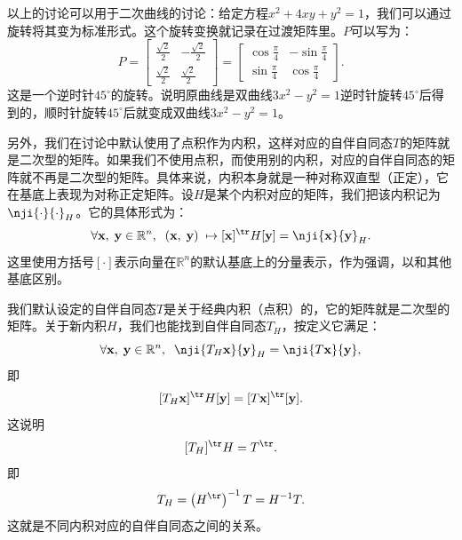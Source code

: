 \documentclass[12pt,UTF8,fontset=none]{ctexbook}
\begin{document}
以上的讨论可以用于二次曲线的讨论：给定方程$x^2 + 4xy + y^2 = 1$，我们可以通过旋转将其变为标准形式。这个旋转变换就记录在过渡矩阵里。$P$可以写为：
$$
P = 
\begin{bmatrix}
    \displaystyle\frac{\sqrt{2}}{2} & \displaystyle -\frac{\sqrt{2}}{2} \\\displaystyle \frac{\sqrt{2}}{2} & \displaystyle\frac{\sqrt{2}}{2}
\end{bmatrix} = \begin{bmatrix}
    \displaystyle\cos{\frac{\pi}{4}} & \displaystyle -\sin{\frac{\pi}{4}} \\ \displaystyle\sin{\frac{\pi}{4}} & \displaystyle\cos{\frac{\pi}{4}}
\end{bmatrix}.
$$
这是一个逆时针$45^\circ$的旋转。说明原曲线是双曲线$3x^2 - y^2 = 1$逆时针旋转$45^\circ$后得到的，顺时针旋转$45^\circ$后就变成双曲线$3x^2 - y^2 = 1$。

另外，我们在讨论中默认使用了点积作为内积，这样对应的自伴自同态$T$的矩阵就是二次型的矩阵。如果我们不使用点积，而使用别的内积，对应的自伴自同态的矩阵就不再是二次型的矩阵。具体来说，内积本身就是一种对称双直型（正定），它在基底上表现为对称正定矩阵。设$H$是某个内积对应的矩阵，我们把该内积记为$\nji{\cdot}{\cdot}_H$。它的具体形式为：
$$ \forall \mathbf{x}, \; \mathbf{y} \in \mathbb{R}^n , \;\; (\mathbf{x}, \; \mathbf{y}) \; \mapsto [\mathbf{x}]^{\tr} H[\mathbf{y}] = \nji{\mathbf{x}}{\mathbf{y}}_H. $$
这里使用方括号$[\cdot]$表示向量在$\mathbb{R}^n$的默认基底上的分量表示，作为强调，以和其他基底区别。

我们默认设定的自伴自同态$T$是关于经典内积（点积）的，它的矩阵就是二次型的矩阵。关于新内积$H$，我们也能找到自伴自同态$T_H$，按定义它满足：
$$ \forall \mathbf{x}, \; \mathbf{y} \in \mathbb{R}^n , \;\; \nji{T_H\mathbf{x}}{\mathbf{y}}_H = \nji{T\mathbf{x}}{\mathbf{y}}, $$
即
$$ [T_H\mathbf{x}]^{\tr} H[\mathbf{y}] = [T\mathbf{x}]^{\tr} [\mathbf{y}]. $$
这说明
$$ [T_H]^{\tr} H = T^{\tr}.$$
即
$$ T_H = \left(H^{\tr}\right)^{-1} T = H^{-1} T.$$
这就是不同内积对应的自伴自同态之间的关系。
\end{document}
